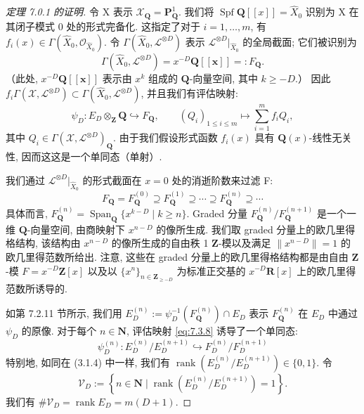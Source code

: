\begin{proof}[定理 7.0.1 的证明]
令 X 表示 \(\mathcal{X}_{\mathbf{Q}} = \mathbf{P}_{\mathbf{Q}}^1\). 
我们将 \(\operatorname{Spf} \mathbf{Q}[\![x]\!] = \widehat{X}_0\) 识别为 X 在其闭子模式 0 处的形式完备化. 
这指定了对于 \(i = 1, \ldots, m\), 有 \(f_i(x) \in \Gamma(\widehat{X}_0, \mathcal{O}_{\widehat{X}_0})\). 
令 \(\Gamma(\widehat{X}_0, \mathcal{L}^{\otimes D})\) 表示 \(\mathcal{L}^{\otimes D}|_{\widehat{X}_0}\) 的全局截面; 
它们被识别为
\[ \Gamma(\widehat{X}_0, \mathcal{L}^{\otimes D}) = x^{-D} \mathbf{Q} [\![\mathbf{x}]\!] =: F_{\mathbf{Q}}. \]
（此处, \(x^{-D}\mathbf{Q}[\![\mathbf{x}]\!]\) 表示由 \(x^k\) 组成的 \(\mathbf{Q}\)-向量空间, 其中 \(k \geq -D\).） 
因此 \(f_i\Gamma(\mathcal{X},\mathcal{L}^{\otimes D}) \subset \Gamma(\widehat{X}_0,\mathcal{L}^{\otimes D})\), 
并且我们有评估映射:
\begin{equation}\label{eq:7.3.8}
\psi_D : E_D \otimes_{\mathbf{Z}} \mathbf{Q} \hookrightarrow F_{\mathbf{Q}}, \qquad (Q_i)_{1 \le i \le m} \mapsto \sum_{i=1}^m f_i Q_i,
\end{equation}
其中 \(Q_i \in \Gamma(\mathcal{X}, \mathcal{L}^{\otimes D})_{\mathbf{Q}}\). 
由于我们假设形式函数 \(f_i(x)\) 具有 \(\mathbf{Q}(x)\)-线性无关性, 
因而这这是一个单同态（单射）.

我们通过 \(\mathcal{L}^{\otimes D}|_{\widehat{X}_{0}}\) 的形式截面在 \(x=0\) 处的消逝阶数来过滤 F:
\[ F_{\mathbf{Q}} = F_{\mathbf{Q}}^{(0)} \supseteq F_{\mathbf{Q}}^{(1)} \supseteq \cdots \supseteq F_{\mathbf{Q}}^{(n)} \supseteq \cdots \]
具体而言, \(F_{\mathbf{Q}}^{(n)} = \operatorname{Span}_{\mathbf{Q}}\{x^{k-D} \mid k \geq n\}\). 
Graded 分量 \(F_{\mathbf{Q}}^{(n)}/F_{\mathbf{Q}}^{(n+1)}\) 是一个一维 \(\mathbf{Q}\)-向量空间, 
由商映射下 \(x^{n-D}\) 的像所生成. 
我们取 graded 分量上的欧几里得格结构, 
该结构由 \(x^{n-D}\) 的像所生成的自由秩 1 \(\mathbf{Z}\)-模以及满足 \(\|x^{n-D}\| = 1\) 的欧几里得范数所给出. 
注意, 这些在 graded 分量上的欧几里得格结构都是由自由 \(\mathbf{Z}\)-模 \(F = x^{-D} \mathbf{Z}[x]\) 
以及以 \(\{x^n\}_{n \in \mathbf{Z}_{\geq -D}}\) 为标准正交基的 \(x^{-D} \mathbf{R}[x]\) 上的欧几里得范数所诱导的.

如第 7.2.11 节所示, 我们用 \(E_D^{(n)} := \psi_D^{-1}\left(F_{\mathbf{Q}}^{(n)}\right) \cap E_D\) 表示 \(F_{\mathbf{Q}}^{(n)}\) 在 \(E_D\) 中通过 \(\psi_D\) 的原像. 
对于每个 \(n \in \mathbf{N}\), 评估映射 \eqref{eq:7.3.8} 诱导了一个单同态:
\[ \psi_D^{(n)}: E_D^{(n)}/E_D^{(n+1)} \hookrightarrow F_D^{(n)}/F_D^{(n+1)} \]
特别地, 如同在 (3.1.4) 中一样, 我们有 \(\operatorname{rank} \left(E_D^{(n)}/E_D^{(n+1)}\right) \in \{0,1\}\). 令
\[ \mathcal{V}_D := \left\{ n \in \mathbf{N} \mid \operatorname{rank}\left(E_D^{(n)}/E_D^{(n+1)}\right) = 1 \right\}. \]
我们有 \(\#\mathcal{V}_D = \operatorname{rank} E_D = m(D+1)\).


\end{proof}
